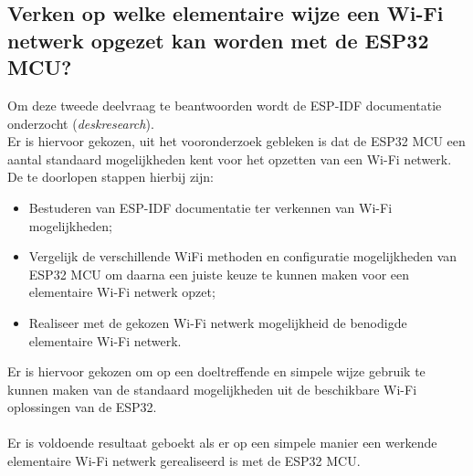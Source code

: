 \subsection{Verken op welke elementaire wijze een Wi-Fi netwerk opgezet kan worden met de ESP32 MCU?}
Om deze tweede deelvraag te beantwoorden wordt de ESP-IDF documentatie onderzocht (\textit{deskresearch}). 
\\ 
Er is hiervoor gekozen, uit het vooronderzoek gebleken is dat de ESP32 MCU een aantal standaard mogelijkheden kent voor het opzetten van een Wi-Fi netwerk. 
De te doorlopen stappen hierbij zijn:
\begin{itemize}
  \item[\ding{226}] Bestuderen van ESP-IDF documentatie ter verkennen van Wi-Fi mogelijkheden; 
  \item[\ding{226}] Vergelijk de verschillende WiFi methoden en configuratie mogelijkheden van ESP32 MCU om daarna een juiste keuze te kunnen maken voor een elementaire Wi-Fi netwerk opzet;
  \item[\ding{226}] Realiseer met de gekozen Wi-Fi netwerk mogelijkheid de benodigde elementaire Wi-Fi netwerk.
\end{itemize}
Er is hiervoor gekozen om op een doeltreffende en simpele wijze gebruik te kunnen maken van de standaard mogelijkheden uit de beschikbare Wi-Fi oplossingen van de ESP32. 
\\\\
Er is voldoende resultaat geboekt als er op een simpele manier een werkende elementaire Wi-Fi netwerk gerealiseerd is met de ESP32 MCU.

